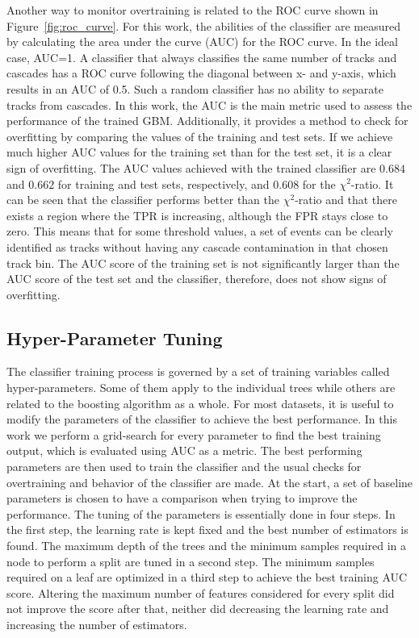 Another way to monitor overtraining is related to the ROC curve shown in Figure~\ref{fig:roc_curve}.
For this work, the abilities of the classifier are measured by calculating the area under the curve (AUC) for the ROC curve.
In the ideal case, AUC=1.
A classifier that always classifies the same number of tracks and cascades has a ROC curve following the diagonal between x- and y-axis, which results in an AUC of 0.5.
Such a random classifier has no ability to separate tracks from cascades.
In this work, the AUC is the main metric used to assess the performance of the trained GBM.
Additionally, it provides a method to check for overfitting by comparing the values of the training and test sets.
If we achieve much higher AUC values for the training set than for the test set, it is a clear sign of overfitting.
The AUC values achieved with the trained classifier are $0.684$ and $0.662$ for training and test sets, respectively, and $0.608$ for the $\chi^2$-ratio.
It can be seen that the classifier performs better than the $\chi^2$-ratio and that there exists a region where the TPR is increasing, although the FPR stays close to zero.
This means that for some threshold values, a set of events can be clearly identified as tracks without having any cascade contamination in that chosen track bin.
The AUC score of the training set is not significantly larger than the AUC score of the test set and the classifier, therefore, does not show signs of overfitting.


\subsection{Hyper-Parameter Tuning}

The classifier training process is governed by a set of training variables called hyper-parameters.
Some of them apply to the individual trees while others are related to the boosting algorithm as a whole.
For most datasets, it is useful to modify the parameters of the classifier to achieve the best performance.
In this work we perform a grid-search for every parameter to find the best training output, which is evaluated using AUC as a metric.
The best performing parameters are then used to train the classifier and the usual checks for overtraining and behavior of the classifier are made.
At the start, a set of baseline parameters is chosen to have a comparison when trying to improve the performance.
The tuning of the parameters is essentially done in four steps. In the first step, the learning rate is kept fixed and the best number of estimators is found.
The maximum depth of the trees and the minimum samples required in a node to perform a split are tuned in a second step.
The minimum samples required on a leaf are optimized in a third step to achieve the best training AUC score.
Altering the maximum number of features considered for every split did not improve the score after that, neither did decreasing the learning rate and increasing the number of estimators.

